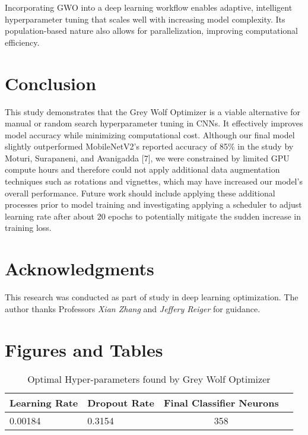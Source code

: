 \documentclass[conference]{IEEEtran}
\begin{document}
Incorporating GWO into a deep learning workflow enables adaptive, intelligent hyperparameter tuning that scales well with increasing model complexity. Its population-based nature also allows for parallelization, improving computational efficiency.


\section{Conclusion}
This study demonstrates that the Grey Wolf Optimizer is a viable alternative for manual or random search hyperparameter tuning in CNNs. It effectively improves model accuracy while minimizing computational cost. Although our final model slightly outperformed MobileNetV2’s reported accuracy of 85\% in the study by Moturi, Surapaneni, and Avanigadda [7], we were constrained by limited GPU compute hours and therefore could not apply additional data augmentation techniques such as rotations and vignettes, which may have increased our model's overall performance. Future work should include applying these additional processes prior to model training and investigating applying a scheduler to adjust learning rate after about 20 epochs to potentially mitigate the sudden increase in training loss. 

\section*{Acknowledgments}
This research was conducted as part of study in deep learning optimization. The author thanks Professors \textit{Xian Zhang} and \textit{Jeffery Reiger} for guidance.

\section*{Figures and Tables}

\begin{table}[htbp]
\caption{Optimal Hyper-parameters found by Grey Wolf Optimizer}
\begin{center}
\begin{tabular}{|l|l|c|l|}
\hline
\textbf{Learning Rate} &\textbf{Dropout Rate} & \textbf{Final Classifier Neurons}\\
\hline
0.00184 & 0.3154 & 358\\

\hline
\end{tabular}
\label{tab1}
\end{center}
\end{table}
\end{document}
